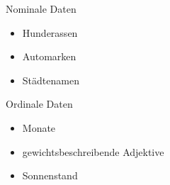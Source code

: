 Nominale Daten
\begin{itemize}
	\item Hunderassen
	\item Automarken
	\item Städtenamen
\end{itemize}

Ordinale Daten
\begin{itemize}
	\item Monate
	\item gewichtsbeschreibende Adjektive
	\item Sonnenstand
\end{itemize}
